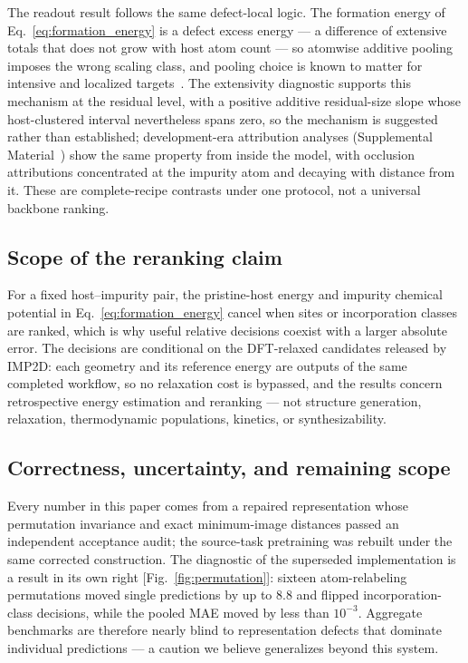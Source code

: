 The readout result follows the same defect-local logic.  The formation
energy of Eq.~\eqref{eq:formation_energy} is a defect excess energy --- a
difference of extensive totals that does not grow with host atom count ---
so atomwise additive pooling imposes the wrong scaling class, and pooling
choice is known to matter for intensive and localized
targets~\cite{buterez2023pooling}.  The extensivity diagnostic supports
this mechanism at the residual level, with a positive additive
residual-size slope whose host-clustered interval nevertheless spans zero,
so the mechanism is suggested rather than established; development-era
attribution analyses (Supplemental Material~\cite{supplemental}) show the
same property from inside the model, with occlusion attributions
concentrated at the impurity atom and decaying with distance from it.
These are complete-recipe contrasts under one protocol, not a universal
backbone ranking.

\subsection{Scope of the reranking claim}

For a fixed host--impurity pair, the pristine-host energy and impurity
chemical potential in Eq.~\eqref{eq:formation_energy} cancel when sites or
incorporation classes are ranked, which is why useful relative decisions
coexist with a larger absolute error.  The decisions are conditional on
the DFT-relaxed candidates released by IMP2D: each geometry and its
reference energy are outputs of the same completed workflow, so no
relaxation cost is bypassed, and the results concern retrospective energy
estimation and reranking --- not structure generation, relaxation,
thermodynamic populations, kinetics, or synthesizability.

\subsection{Correctness, uncertainty, and remaining scope}

Every number in this paper comes from a repaired representation whose
permutation invariance and exact minimum-image distances passed an
independent acceptance audit; the source-task pretraining was rebuilt under
the same corrected construction.  The diagnostic of the superseded
implementation is a result in its own right [Fig.~\ref{fig:permutation}]:
sixteen atom-relabeling permutations moved single predictions by up to
$8.8$\eV{} and flipped incorporation-class decisions, while the pooled MAE
moved by less than $10^{-3}$\eV{}.  Aggregate benchmarks are therefore
nearly blind to representation defects that dominate individual predictions
--- a caution we believe generalizes beyond this system.

